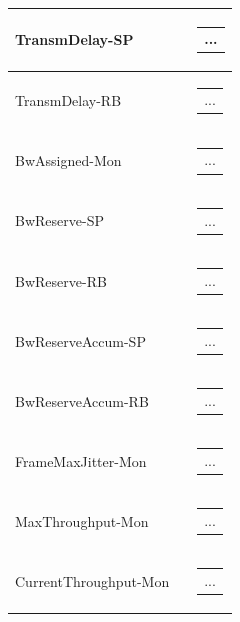 \documentclass[openany]{article}
\begin{document}
\begin{longtable}{| m{3.0cm} m{4.5cm} m{7.0cm} |}
        TransmDelay-SP &  & \begin{tabular}{@{}m{6cm}@{}}
                ...
            \end{tabular} \\ \hline
        TransmDelay-RB &  & \begin{tabular}{@{}m{6cm}@{}}
                ...
            \end{tabular} \hypertarget{}{}\\ \hline
        BwAssigned-Mon &  & \begin{tabular}{@{}m{6cm}@{}}
                ...
            \end{tabular} \hypertarget{}{}\\ \hline
        BwReserve-SP &  & \begin{tabular}{@{}m{6cm}@{}}
                ...
            \end{tabular} \\ \hline
        BwReserve-RB &  & \begin{tabular}{@{}m{6cm}@{}}
                ...
            \end{tabular} \hypertarget{}{}\\ \hline
        BwReserveAccum-SP &  & \begin{tabular}{@{}m{6cm}@{}}
                ...
            \end{tabular} \\ \hline
        BwReserveAccum-RB &  & \begin{tabular}{@{}m{6cm}@{}}
                ...
            \end{tabular} \hypertarget{}{}\\ \hline
        FrameMaxJitter-Mon &  & \begin{tabular}{@{}m{6cm}@{}}
                ...
            \end{tabular} \hypertarget{}{}\\ \hline
        MaxThroughput-Mon &  & \begin{tabular}{@{}m{6cm}@{}}
                ...
            \end{tabular} \hypertarget{}{}\\ \hline
        CurrentThroughput-Mon &  & \begin{tabular}{@{}m{6cm}@{}}
                ...
            \end{tabular} \hypertarget{pv:soft-roi-off-x}{}\\ \hline

\end{longtable}
\end{document}
